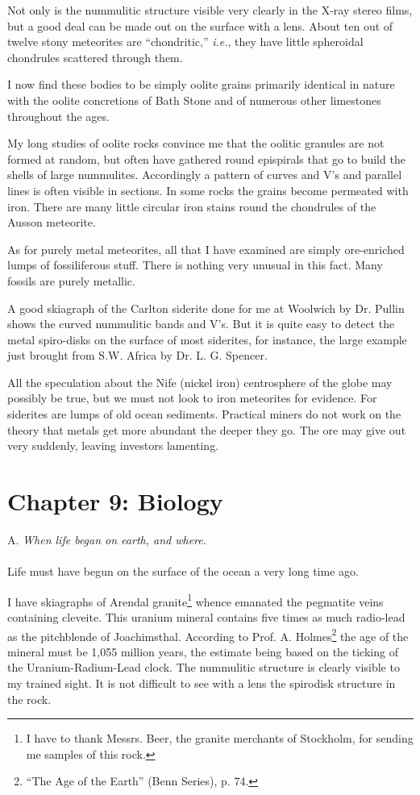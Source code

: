 \documentclass[a4paper, 12pt, oneside]{article}
\begin{document}
Not only is the nummulitic structure visible very clearly in the X-ray stereo films, but a good deal can be made out on the surface with a lens. About ten out of twelve stony meteorites are ``chondritic,'' \emph{i.e.}, they have little spheroidal chondrules scattered through them.

I now find these bodies to be simply oolite grains primarily identical in nature with the oolite concretions of Bath Stone and of numerous other limestones throughout the ages.

My long studies of oolite rocks convince me that the oolitic granules are not formed at random, but often have gathered round epispirals that go to build the shells of large nummulites. Accordingly a pattern of curves and V's and parallel lines is often visible in sections. In some rocks the grains become permeated with iron. There are many little circular iron stains round the chondrules of the Ausson meteorite.

As for purely metal meteorites, all that I have examined are simply ore-enriched lumps of fossiliferous stuff. There is nothing very unusual in this fact. Many fossils are purely metallic.

A good skiagraph of the Carlton siderite done for me at Woolwich by Dr. Pullin shows the curved nummulitic bands and V's. But it is quite easy to detect the metal spiro-disks on the surface of most siderites, for instance, the large example just brought from S.W. Africa by Dr. L. G. Spencer.

All the speculation about the Nife (nickel iron) centrosphere of the globe may possibly be true, but we must not look to iron meteorites for evidence. For siderites are lumps of old ocean sediments. Practical miners do not work on the theory that metals get more abundant the deeper they go. The ore may give out very suddenly, leaving investors lamenting.
\clearpage
\section{Chapter 9: Biology}
\centerline{A. \emph{When life began on earth, and where}.}
\paragraph{}
Life must have begun on the surface of the ocean a very long time ago.

I have skiagraphs of Arendal granite\footnote{I have to thank Messrs. Beer, the granite merchants of Stockholm, for sending me samples of this rock.} whence emanated the pegmatite veins containing cleveite. This uranium mineral contains five times as much radio-lead as the pitchblende of Joachimsthal. According to Prof. A. Holmes\footnote{``The Age of the Earth'' (Benn Series), p. 74.} the age of the mineral must be 1,055 million years, the estimate being based on the ticking of the Uranium-Radium-Lead clock. The nummulitic structure is clearly visible to my trained sight. It is not difficult to see with a lens the spirodisk structure in the rock.
\end{document}
